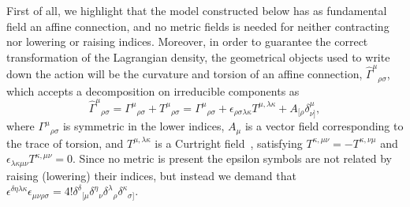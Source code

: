 \documentclass[aps,prd,12pt,twocolumn,superscriptaddress,showpacs,showkeys,reprint,longbibliography]{revtex4-1}
\renewcommand{\(}{\left(}
\renewcommand{\)}{\right)}
\renewcommand{\[}{\left[}
\renewcommand{\]}{\right]}
\begin{document}
First of all, we highlight that the model constructed below has as fundamental field an affine connection, and no metric fields is needed for neither contracting nor lowering or raising indices. Moreover, in order to guarantee the correct transformation of the Lagrangian density, the geometrical objects used to write down the action will be the curvature and torsion of an affine connection, $\hat{\Gamma}^\mu{}_{\rho\sigma}$, which accepts a decomposition on irreducible components as
\begin{equation}
  \hat{\Gamma}^\mu{}_{\rho\sigma} = {\Gamma}^\mu{}_{\rho\sigma} + T^\mu{}_{\rho\sigma} = {\Gamma}^\mu{}_{\rho\sigma} + \epsilon_{\rho\sigma\lambda\kappa}T^{\mu,\lambda\kappa}+A_{[\rho}\delta^\mu_{\nu]},
\end{equation}
where ${\Gamma}^\mu{}_{\rho\sigma}$ is symmetric in the lower indices, $A_\mu$ is a vector field corresponding to the trace of torsion, and  $T^{\mu,\lambda\kappa}$ is a Curtright field~\cite{Curtright:1980yk}, satisfying \mbox{$T^{\kappa,\mu\nu } = - T^{\kappa,\nu\mu }$} and $\epsilon_{\lambda\kappa\mu\nu}T^{\kappa,\mu\nu }=0$. Since no metric is present  the epsilon symbols are not related by raising (lowering) their indices, but instead we demand that \mbox{$\epsilon^{\delta\eta\lambda\kappa}\epsilon_{\mu\nu\rho\sigma}=4!\delta^{\delta}{}_{[\mu}\delta^\eta{}_{\nu}\delta^{\lambda}{}_{\rho} \delta^\kappa{}_{\sigma]}$.}
\end{document}
